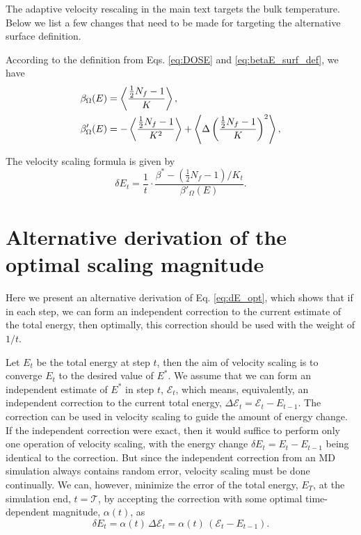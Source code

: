 \documentclass[reprint]{revtex4-1}
\begin{document}
The adaptive velocity rescaling in the main text
targets the bulk temperature.
%
Below we list a few changes that need to be made
for targeting the alternative surface definition.

According to the definition from
Eqs. \eqref{eq:DOSE} and \eqref{eq:betaE_surf_def},
we have
\begin{align}
  \beta_\Omega(E)
  &=
  \left\langle
    \frac{ \frac{1}{2}N_f - 1 } { K }
  \right\rangle
  ,
  \notag
  \\
  \beta'_\Omega(E)
  &=
  -
  \left\langle
    \frac{ \frac{1}{2} N_f - 1 } { K^2 }
  \right\rangle
  +
  \left\langle
    \Delta
    \left(
      \frac{ \frac{1}{2} N_f - 1 } { K }
    \right)^2
  \right\rangle
  ,
  \notag
\end{align}

The velocity scaling formula is given by
\begin{equation}
  \delta E_t
  =
  \frac{1}{t} \cdot
  \frac{ \beta^* - (\frac{1}{2} N_f - 1)/K_t }
  { \beta'_\Omega(E) }
  .
\end{equation}


\section{\label{sec:error}
  Alternative derivation of
  the optimal scaling magnitude
}

\newcommand{\tmax}{\mathcal T}

Here we present an alternative derivation of Eq. \eqref{eq:dE_opt},
which shows that if in each step, we can form an independent correction
to the current estimate of the total energy,
then optimally,
this correction should be used
with the weight of $1/t$.

Let $E_t$ be the total energy at step $t$,
then the aim of velocity scaling is to converge $E_t$
to the desired value of $E^*$.
%
We assume that we can form an independent estimate of $E^*$
in step $t$, $\mathcal E_t$,
which means, equivalently, an independent correction
to the current total energy,
$\Delta \mathcal E_t = \mathcal E_t - E_{t-1}$.
%
The correction can be used in velocity scaling
to guide the amount of energy change.
%
If the independent correction were exact,
then it would suffice to perform
only one operation of velocity scaling,
with the energy change
$\delta E_t = E_t - E_{t-1}$
being identical to the correction.
%
But since
the independent correction from an MD simulation
always contains random error,
velocity scaling must be done continually.
%
We can, however, minimize the error
of the total energy, $E_T$,
at the simulation end, $t = \tmax$,
by accepting the correction with some
optimal time-dependent magnitude, $\alpha(t)$,
as
%
\begin{equation}
  \delta E_t
  =
  \alpha(t) \, \Delta \mathcal E_t
  =
  \alpha(t) \, \left( \mathcal E_t - E_{t - 1} \right)
  .
  \label{eq:Eupdate}
\end{equation}
%
\end{document}

